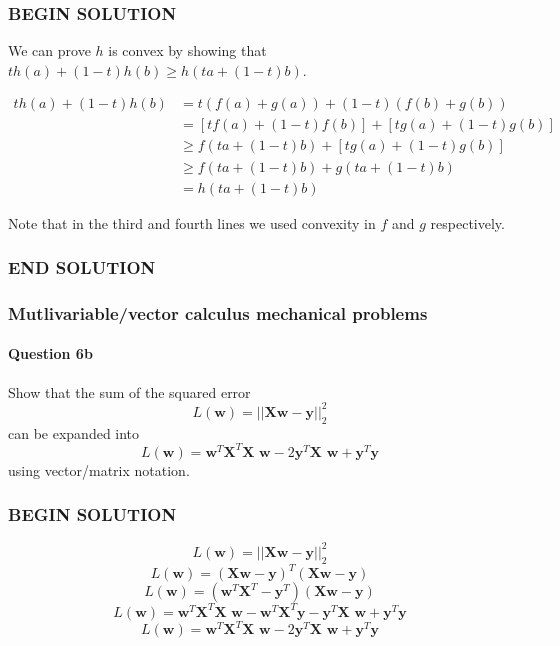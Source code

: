 \documentclass[11pt]{article}
\begin{document}
    \subsubsection{BEGIN SOLUTION}\label{begin-solution}

We can prove \(h\) is convex by showing that
\(th(a) + (1-t)h(b) \geq h(ta + (1-t)b)\).

\[
\begin{aligned}
th(a) + (1-t)h(b) &= t(f(a) + g(a)) + (1-t)(f(b) + g(b)) \\
&= [tf(a) + (1-t)f(b)] + [tg(a) + (1-t)g(b)] \\
&\geq f(ta + (1-t)b) + [tg(a) + (1-t)g(b)] \\
&\geq f(ta + (1-t)b) + g(ta + (1-t)b) \\
&= h(ta + (1-t)b)
\end{aligned}
\]

Note that in the third and fourth lines we used convexity in \(f\) and
\(g\) respectively.

\subsubsection{END SOLUTION}\label{end-solution}

    \subsubsection{Mutlivariable/vector calculus mechanical
problems}\label{mutlivariablevector-calculus-mechanical-problems}

\paragraph{Question 6b}\label{question-6b}

Show that the sum of the squared error
\[L(\textbf{w}) = ||\textbf{Xw}-\textbf{y}||_2^2\] can be expanded into
\[L(\textbf{w}) = \textbf{w}^T \textbf{X}^T \textbf{X w} - 2 \textbf{y}^T \textbf{X w} + \textbf{y}^T \textbf{y}\]
using vector/matrix notation.

    \subsubsection{BEGIN SOLUTION}\label{begin-solution}

\[L(\textbf{w}) = ||\textbf{Xw} - \textbf{y}||_2^2\]
\[L(\textbf{w}) = (\textbf{Xw} - \textbf{y})^T (\textbf{Xw} - \textbf{y})\]
\[L(\textbf{w}) = (\textbf{w}^T \textbf{X}^T- \textbf{y}^T) (\textbf{Xw} - \textbf{y})\]
\[L(\textbf{w}) = \textbf{w}^T \textbf{X}^T \textbf{X w} - \textbf{w}^T \textbf{X}^T \textbf{y} - \textbf{y}^T \textbf{X w} + \textbf{y}^T \textbf{y}\]
\[L(\textbf{w}) = \textbf{w}^T \textbf{X}^T \textbf{X w} - 2 \textbf{y}^T \textbf{X w} + \textbf{y}^T \textbf{y}\]
\end{document}
